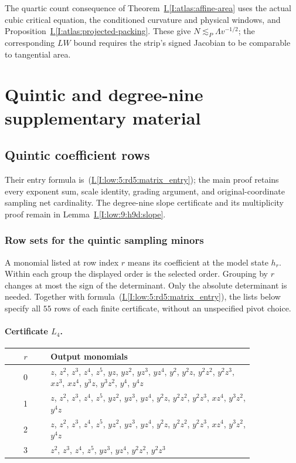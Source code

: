 \documentclass[11pt]{amsart}
\theoremstyle{definition}
\theoremstyle{remark}
\numberwithin{equation}{section}
\newcommand{\partIref}[1]{\hyperref[I:#1]{I.\ref*{I:#1}}}
\newcommand{\partIeqref}[1]{\textup{(\partIref{#1})}}
\begin{document}
The quartic count consequence of Theorem~\partIref{atlas:affine-area} uses the actual cubic critical equation, the conditioned curvature and physical windows, and Proposition~\partIref{atlas:projected-packing}. These give $N\lesssim_P\Lambda v^{-1/2}$; the corresponding $LW$ bound requires the strip's signed Jacobian to be comparable to tangential area.

\section{Quintic and degree-nine supplementary material}

\subsection{Quintic coefficient rows}\label{supp:quintic-nine}
Their entry formula is~\partIeqref{low:5:rd5:matrix_entry}; the main proof retains every exponent sum, scale identity, grading argument, and original-coordinate sampling net cardinality. The degree-nine slope certificate and its multiplicity proof remain in Lemma~\partIref{low:9:h9d:slope}.

\subsubsection{Row sets for the quintic sampling minors}\label{low:5:rd5:rows}

A monomial listed at row index $r$ means its coefficient at the model state $h_r$. Within each group the displayed order is the selected order. Grouping by $r$ changes at most the sign of the determinant. Only the absolute determinant is needed. Together with formula~\partIeqref{low:5:rd5:matrix_entry}, the lists below specify all $55$ rows of each finite certificate, without an unspecified pivot choice.

\paragraph{Certificate $L_{4}$.}\mbox{}
\begin{center}
\begin{tabular}{cp{0.83\linewidth}}
$r$ & Output monomials\\\hline
0 & \(z\), \(z^{2}\), \(z^{3}\), \(z^{4}\), \(z^{5}\), \(yz\), \(yz^{2}\), \(yz^{3}\), \(yz^{4}\), \(y^{2}\), \(y^{2}z\), \(y^{2}z^{2}\), \(y^{2}z^{3}\), \(xz^{3}\), \(xz^{4}\), \(y^{3}z\), \(y^{3}z^{2}\), \(y^{4}\), \(y^{4}z\)\\
1 & \(z\), \(z^{2}\), \(z^{3}\), \(z^{4}\), \(z^{5}\), \(yz^{2}\), \(yz^{3}\), \(yz^{4}\), \(y^{2}z\), \(y^{2}z^{2}\), \(y^{2}z^{3}\), \(xz^{4}\), \(y^{3}z^{2}\), \(y^{4}z\)\\
2 & \(z\), \(z^{2}\), \(z^{3}\), \(z^{4}\), \(z^{5}\), \(yz^{2}\), \(yz^{3}\), \(yz^{4}\), \(y^{2}z\), \(y^{2}z^{2}\), \(y^{2}z^{3}\), \(xz^{4}\), \(y^{3}z^{2}\), \(y^{4}z\)\\
3 & \(z^{2}\), \(z^{3}\), \(z^{4}\), \(z^{5}\), \(yz^{3}\), \(yz^{4}\), \(y^{2}z^{2}\), \(y^{2}z^{3}\)\\
\end{tabular}
\end{center}
\end{document}
